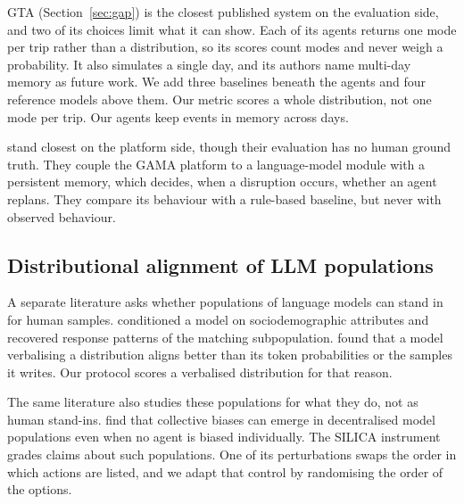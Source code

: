 GTA (Section~\ref{sec:gap}) is the closest published system on the evaluation side, and two of
its choices limit what it can show. Each of its agents returns one mode per trip rather than a
distribution, so its scores count modes and never weigh a probability. It also simulates a
single day, and its authors name multi-day memory as future work. We add three baselines
beneath the agents and four reference models above them. Our metric scores a whole
distribution, not one mode per trip. Our agents keep events in memory across days.

\citet{alves2026evaluating} stand closest on the platform side, though their evaluation has no
human ground truth. They couple the GAMA platform to a language-model module with a persistent
memory, which decides, when a disruption occurs, whether an agent replans. They compare its
behaviour with a rule-based baseline, but never with observed behaviour.

\subsection{Distributional alignment of LLM populations}
\label{sec:alignment}

A separate literature asks whether populations of language models can stand in for human
samples. \citet{argyle2023outofone} conditioned a model on sociodemographic attributes and
recovered response patterns of the matching subpopulation. \citet{meister2024benchmarking}
found that a model verbalising a distribution aligns better than its token probabilities or
the samples it writes. Our protocol scores a verbalised distribution for that reason.

The same literature also studies these populations for what they do, not as human stand-ins.
\citet{baronchelli2025emergent} find that collective biases can emerge in decentralised model
populations even when no agent is biased individually. The SILICA instrument
\citep{bintareaf2026silica} grades claims about such populations. One of its perturbations
swaps the order in which actions are listed, and we adapt that control by randomising the
order of the options.
